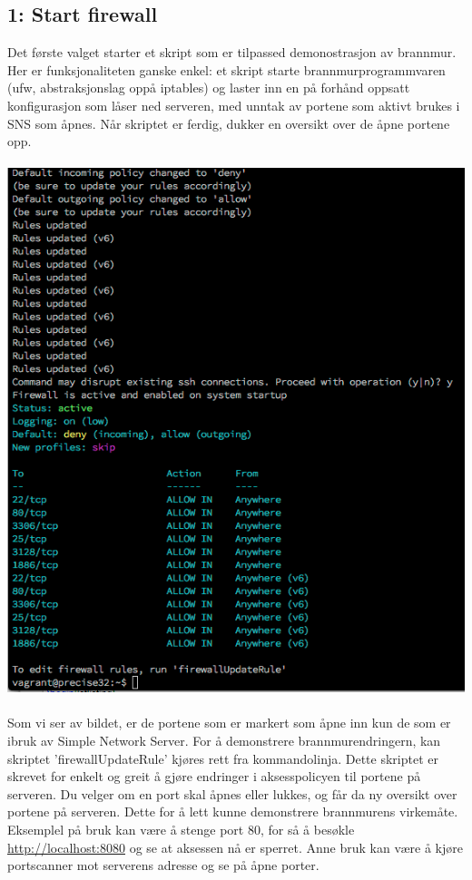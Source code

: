 \documentclass{article}
\begin{document}
\subsection{1: Start firewall}
Det første valget starter et skript som er tilpassed demonostrasjon av brannmur. \\ Her er funksjonaliteten ganske enkel: et skript starte brannmurprogrammvaren (ufw, abstraksjonslag oppå iptables) og laster inn en på forhånd oppsatt konfigurasjon som låser ned serveren, med unntak av portene som aktivt brukes i SNS som åpnes. Når skriptet er ferdig, dukker en oversikt over de åpne portene opp. 
\\ \\
\includegraphics[scale = 0.7]{firewall.png}
\\ \\ 
Som vi ser av bildet, er de portene som er markert som åpne inn kun de som er ibruk av Simple Network Server. 
For å demonstrere brannmurendringern, kan skriptet 'firewallUpdateRule' kjøres rett fra kommandolinja. Dette skriptet er skrevet for enkelt og greit å gjøre endringer i aksesspolicyen til portene på serveren. Du velger om en port skal åpnes eller lukkes, og får da ny oversikt over portene på serveren. Dette for å lett kunne demonstrere brannmurens virkemåte. Eksemplel på bruk kan være å stenge port 80, for så å besøkle \url{http://localhost:8080} og se at aksessen nå er sperret. Anne bruk kan være å kjøre portscanner mot serverens adresse og se på åpne porter. 
\end{document}

